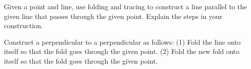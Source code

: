 \documentclass[nooutcomes]{ximera}
\begin{document}
\begin{problem}
Given a point and line, use folding and tracing to construct a line parallel
  to the given line that passes through the given point. Explain the
  steps in your construction.
\begin{hint}
Construct a perpendicular to a perpendicular as follows:  (1) Fold the line onto itself so that the fold goes through the given point. 
(2) Fold the new fold onto itself so that the fold goes through the given point.
\end{hint}
\end{problem}

%
%
%
%
%
%
%

\end{document}
